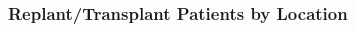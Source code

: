 \documentclass{beamer}
\begin{document}
\begin{frame}
\frametitle{Replant/Transplant Patients by Location}
\begin{columns}[T]
\begin{column}{.7\textwidth}
\begin{figure}
\setlength{\fboxsep}{0pt}%
\setlength{\fboxrule}{1pt}%
\end{figure}
\end{column}

\begin{column}{.3\textwidth}
\begin{figure}
\setlength{\fboxsep}{0pt}%
\setlength{\fboxrule}{1pt}%
\end{figure}
\end{column}
\end{columns}
\end{frame}
\end{document}
